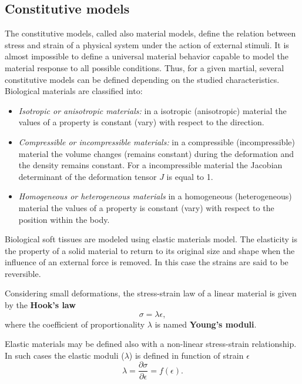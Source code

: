 \subsection{Constitutive models}\label{subsection:constitutivemodels}
   The constitutive models, called also material models, define the relation between stress and strain of a physical system under the action of external stimuli. It is almost impossible to define a universal material behavior capable to model the material response to all possible conditions. Thus, for a given martial, several constitutive models can be defined depending on the studied characteristics. \\
	Biological materials are classified into:
	\begin{itemize}
\item \textit{ Isotropic or anisotropic materials:} in a isotropic (anisotropic) material the values of a property is constant (vary) with respect to the direction.

\item\textit{ Compressible or incompressible materials:} in a compressible (incompressible) material the volume changes (remains constant) during the deformation and the density remains constant. For a incompressible material the Jacobian determinant of the deformation tensor $J$ is equal to 1. 

\item \textit{Homogeneous or heterogeneous materials} in a homogeneous (heterogeneous) material the values of a property is constant (vary) with respect to the position within the body.
	\end{itemize}

Biological soft tissues are modeled using elastic materials model. The elasticity is the property of a solid material to return to its original size and shape when the influence of an external force is removed. In this case the strains are said to be reversible. 
	 
Considering small deformations, the stress-strain law of a linear material is given by the \textbf{Hook's law} $$\sigma = \lambda \epsilon,$$ where  the coefficient of proportionality $\lambda$  is named \textbf{Young's moduli}. 

 Elastic materials may be defined also with a non-linear stress-strain relationship. In such cases the elastic moduli ($\lambda $) is defined in function of strain $\epsilon$ $$\lambda = \frac{\partial \sigma}{\partial \epsilon} = f(\epsilon).$$

